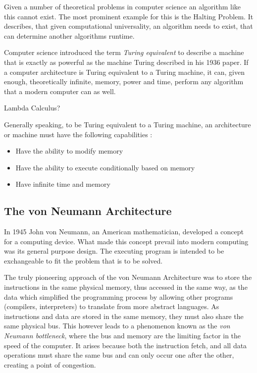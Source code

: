 Given a number of theoretical problems in computer science an algorithm like this cannot exist. The most prominent example for this is the Halting Problem. It describes, that given computational universality, an algorithm needs to exist, that can determine another algorithms runtime. \cite{haltingproblem}

Computer science introduced the term \textit{Turing equivalent} to describe a machine that is exactly as powerful as the machine Turing described in his 1936 paper. If a computer architecture is Turing equivalent to a Turing machine, it can, given enough, theoretically infinite, memory, power and time, perform any algorithm that a modern computer can as well.

Lambda Calculus?

Generally speaking, to be Turing equivalent to a Turing machine, an architecture or machine must have the following capabilities \cite{beneaterturing}:
\begin{itemize}
  \item Have the ability to modify memory
  \item Have the ability to execute conditionally based on memory
  \item Have infinite time and memory
\end{itemize}


\subsection{The von Neumann Architecture}
In 1945 John von Neumann, an American mathematician, developed a concept for a computing device. What made this concept prevail into modern computing was its general purpose design. The executing program is intended to be exchangeable to fit the problem that is to be solved.

The truly pioneering approach of the von Neumann Architecture was to store the instructions in the same physical memory, thus accessed in the same way, as the data which simplified the programming process by allowing other programs (compilers, interpreters) to translate from more abstract languages. As instructions and data are stored in the same memory, they must also share the same physical bus. This however leads  to a phenomenon known as the \textit{von Neumann bottleneck}, where the bus and memory are the limiting factor in the speed of the computer. It arises because both the instruction fetch, and all data operations must share the same bus and can only occur one after the other, creating a point of congestion. 

